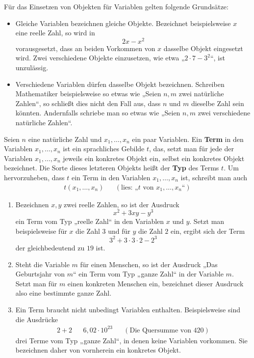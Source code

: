 \begin{bem}
    Für das Einsetzen von Objekten für Variablen gelten folgende Grundsätze:
    \begin{itemize}
        \item Gleiche Variablen bezeichnen gleiche Objekte. Bezeichnet beispielsweise $x$ eine reelle Zahl, so wird in
            \[ 2x-x^2 \]
        vorausgesetzt, dass an beiden Vorkommen von $x$ dasselbe Objekt eingesetzt wird. Zwei verschiedene Objekte einzusetzen, wie etwa „$2\cdot 7 - 3^2$“, ist unzulässig.
        \item Verschiedene Variablen dürfen dasselbe Objekt bezeichnen. Schreiben Mathematiker beispielsweise so etwas wie „Seien $n,m$ zwei natürliche Zahlen“, so schließt dies nicht den Fall aus, dass $n$ und $m$ dieselbe Zahl sein könnten. Andernfalls schriebe man so etwas wie „Seien $n,m$ zwei verschiedene natürliche Zahlen“.
    \end{itemize}
\end{bem}


\begin{de}[Term] 
    Seien $n$ eine natürliche Zahl und $x_1,\dots , x_n$ ein paar Variablen. Ein \textbf{Term} in den Variablen $x_1,\dots , x_n$ ist ein sprachliches Gebilde $t$, das, setzt man für jede der Variablen $x_1,\dots ,x_n$ jeweils ein konkretes Objekt ein, selbst ein konkretes Objekt bezeichnet. Die Sorte dieses letzteren Objekts heißt der \textbf{Typ} des Terms $t$. Um hervorzuheben, dass $t$ ein Term in den Variablen $x_1,\dots , x_n$ ist, schreibt man auch
    \begin{align*}
        t(x_1,\dots , x_n) && (\text{lies: „$t$ von $x_1,\dots , x_n$“})
    \end{align*}
\end{de}


\begin{bsp} \quad
    \begin{enumerate}
        \item Bezeichnen $x,y$ zwei reelle Zahlen, so ist der Ausdruck
            \[ x^2+3xy-y^3 \]
        ein Term vom Typ „reelle Zahl“ in den Variablen $x$ und $y$. Setzt man beispielsweise für $x$ die Zahl $3$ und für $y$ die Zahl $2$ ein, ergibt sich der Term
            \[ 3^2 + 3\cdot 3\cdot 2 - 2^3\]
        der gleichbedeutend zu $19$ ist.
        \item Steht die Variable $m$ für einen Menschen, so ist der Ausdruck „Das Geburtsjahr von $m$“ ein Term vom Typ „ganze Zahl“ in der Variable $m$. Setzt man für $m$ einen konkreten Menschen ein, bezeichnet dieser Ausdruck also eine bestimmte ganze Zahl.
        \item Ein Term braucht nicht unbedingt Variablen enthalten. Beispielsweise sind die Ausdrücke
        \begin{align*}
             2+2 && 6{,}02\cdot 10^{23} && (\text{Die Quersumme von $420$})
        \end{align*}
        drei Terme vom Typ „ganze Zahl“, in denen keine Variablen vorkommen. Sie bezeichnen daher von vornherein ein konkretes Objekt.
    \end{enumerate}
\end{bsp}


